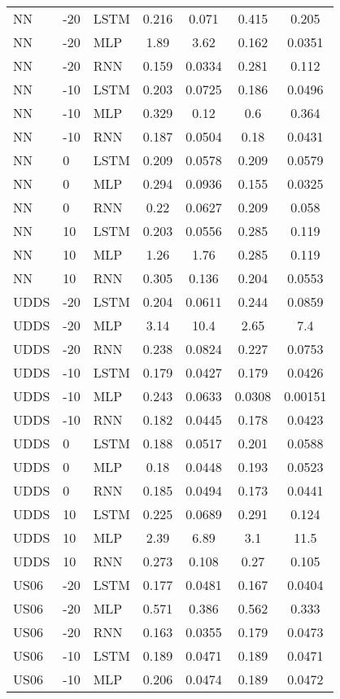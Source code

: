 \begin{table*}[htbp]
\begin{tabular}{lllcccc}
NN & -20 & LSTM & 0.216 & 0.071 & 0.415 & 0.205 \\
NN & -20 & MLP & 1.89 & 3.62 & 0.162 & 0.0351 \\
NN & -20 & RNN & 0.159 & 0.0334 & 0.281 & 0.112 \\
NN & -10 & LSTM & 0.203 & 0.0725 & 0.186 & 0.0496 \\
NN & -10 & MLP & 0.329 & 0.12 & 0.6 & 0.364 \\
NN & -10 & RNN & 0.187 & 0.0504 & 0.18 & 0.0431 \\
NN & 0 & LSTM & 0.209 & 0.0578 & 0.209 & 0.0579 \\
NN & 0 & MLP & 0.294 & 0.0936 & 0.155 & 0.0325 \\
NN & 0 & RNN & 0.22 & 0.0627 & 0.209 & 0.058 \\
NN & 10 & LSTM & 0.203 & 0.0556 & 0.285 & 0.119 \\
NN & 10 & MLP & 1.26 & 1.76 & 0.285 & 0.119 \\
NN & 10 & RNN & 0.305 & 0.136 & 0.204 & 0.0553 \\
UDDS & -20 & LSTM & 0.204 & 0.0611 & 0.244 & 0.0859 \\
UDDS & -20 & MLP & 3.14 & 10.4 & 2.65 & 7.4 \\
UDDS & -20 & RNN & 0.238 & 0.0824 & 0.227 & 0.0753 \\
UDDS & -10 & LSTM & 0.179 & 0.0427 & 0.179 & 0.0426 \\
UDDS & -10 & MLP & 0.243 & 0.0633 & 0.0308 & 0.00151 \\
UDDS & -10 & RNN & 0.182 & 0.0445 & 0.178 & 0.0423 \\
UDDS & 0 & LSTM & 0.188 & 0.0517 & 0.201 & 0.0588 \\
UDDS & 0 & MLP & 0.18 & 0.0448 & 0.193 & 0.0523 \\
UDDS & 0 & RNN & 0.185 & 0.0494 & 0.173 & 0.0441 \\
UDDS & 10 & LSTM & 0.225 & 0.0689 & 0.291 & 0.124 \\
UDDS & 10 & MLP & 2.39 & 6.89 & 3.1 & 11.5 \\
UDDS & 10 & RNN & 0.273 & 0.108 & 0.27 & 0.105 \\
US06 & -20 & LSTM & 0.177 & 0.0481 & 0.167 & 0.0404 \\
US06 & -20 & MLP & 0.571 & 0.386 & 0.562 & 0.333 \\
US06 & -20 & RNN & 0.163 & 0.0355 & 0.179 & 0.0473 \\
US06 & -10 & LSTM & 0.189 & 0.0471 & 0.189 & 0.0471 \\
US06 & -10 & MLP & 0.206 & 0.0474 & 0.189 & 0.0472 \\

\end{tabular}
\end{table*}
